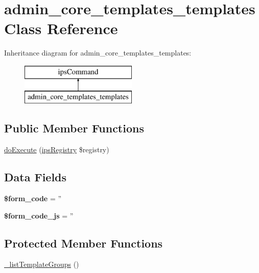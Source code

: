 \hypertarget{classadmin__core__templates__templates}{\section{admin\-\_\-core\-\_\-templates\-\_\-templates Class Reference}
\label{classadmin__core__templates__templates}
}
Inheritance diagram for admin\-\_\-core\-\_\-templates\-\_\-templates\-:\begin{figure}[H]
\begin{center}
\leavevmode
\includegraphics[height=2.000000cm]{classadmin__core__templates__templates}
\end{center}
\end{figure}
\subsection*{Public Member Functions}
\begin{DoxyCompactItemize}
\item 
\hyperlink{classadmin__core__templates__templates_afbc4e912a0604b94d47d66744c64d8ba}{do\-Execute} (\hyperlink{classips_registry}{ips\-Registry} \$registry)
\end{DoxyCompactItemize}
\subsection*{Data Fields}
\begin{DoxyCompactItemize}
\item 
\hypertarget{classadmin__core__templates__templates_af28aee726fa3eb6c355d08a2ab655e03}{{\bfseries \$form\-\_\-code} = ''}\label{classadmin__core__templates__templates_af28aee726fa3eb6c355d08a2ab655e03}

\item 
\hypertarget{classadmin__core__templates__templates_ac68fe8a02a2efd63c3271179f4b4fbb7}{{\bfseries \$form\-\_\-code\-\_\-js} = ''}\label{classadmin__core__templates__templates_ac68fe8a02a2efd63c3271179f4b4fbb7}

\end{DoxyCompactItemize}
\subsection*{Protected Member Functions}
\begin{DoxyCompactItemize}
\item 
\hyperlink{classadmin__core__templates__templates_a00f4fc57a4362480e8cd6f5971d812d8}{\-\_\-list\-Template\-Groups} ()
\end{DoxyCompactItemize}
